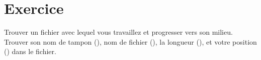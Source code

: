 \section{Exercice}

Trouver un fichier avec lequel vous travaillez et progresser vers
son milieu. Trouver son nom de tampon (), nom de
fichier (), la longueur (), et
votre position () dans le fichier. 

